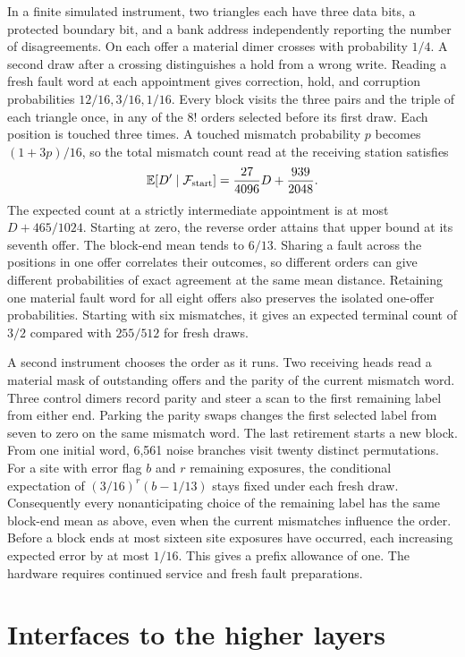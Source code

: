 \documentclass[11pt]{article}
\theoremstyle{remark}
\theoremstyle{plain}
\begin{document}
In a finite simulated instrument, two triangles each have three data bits,
a protected boundary bit, and a bank address independently reporting the
number of disagreements. On each offer a material dimer crosses with
probability \(1/4\). A second draw after a crossing distinguishes a hold
from a wrong write. Reading a fresh fault word at each appointment gives
correction, hold, and corruption probabilities \(12/16,3/16,1/16\).
Every block visits the three pairs and the triple of each triangle once,
in any of the \(8!\) orders selected before its first draw. Each position
is touched three times. A touched mismatch probability \(p\) becomes
\((1+3p)/16\), so the total mismatch count read at the receiving station satisfies
\[
\mathbb E[D'\mid\mathcal F_{\rm start}]
  = \frac{27}{4096}D+\frac{939}{2048}.
\]
The expected count at a strictly intermediate appointment is at most
\(D+465/1024\). Starting at zero, the reverse order attains that upper
bound at its seventh offer. The block-end mean tends to \(6/13\).
Sharing a fault across the positions in one offer correlates their
outcomes, so different orders can give different probabilities of exact
agreement at the same mean distance. Retaining one material fault word
for all eight offers also preserves the isolated one-offer probabilities.
Starting with six mismatches, it gives an expected terminal count of
\(3/2\) compared with \(255/512\) for fresh draws.

A second instrument chooses the order as it runs. Two receiving heads
read a material mask of outstanding offers and the parity of the current
mismatch word. Three control dimers record parity and steer a scan to the
first remaining label from either end. Parking the parity swaps changes the
first selected label from seven to zero on the same mismatch word. The last
retirement starts a new block. From one initial word,
6,561 noise branches visit twenty distinct permutations. For a site with
error flag $b$ and $r$ remaining exposures, the conditional expectation of
$(3/16)^r(b-1/13)$ stays fixed under each fresh draw. Consequently every
nonanticipating choice of the remaining label has the same block-end mean
as above, even when the current mismatches influence the order. Before a
block ends at most sixteen site exposures have occurred, each increasing
expected error by at most $1/16$. This gives a prefix allowance of one.
The hardware requires continued service and fresh fault preparations.

\section{Interfaces to the higher layers}
\label{sec:interfaces}
\end{document}
